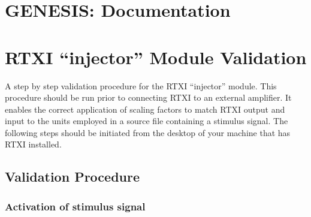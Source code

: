 \documentclass[12pt]{article}
\begin{document}
\section*{GENESIS: Documentation}

\section*{RTXI ``injector'' Module Validation}
A step by step validation procedure for the RTXI ``injector'' module. This procedure should be run prior to connecting RTXI to an external amplifier. It enables the correct application of scaling factors to match RTXI output and input to the units employed in a source file containing a stimulus signal. The following steps should be initiated from the desktop of your machine that has RTXI installed. 

\subsection*{Validation Procedure}

\subsubsection*{Activation of stimulus signal}
\end{document}
